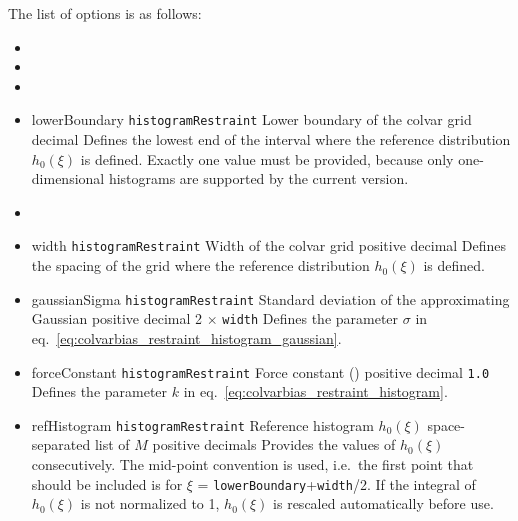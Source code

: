 The list of options is as follows:
\begin{itemize}

\item {}
\item {}
\item {}

\item %
  \key
    {lowerBoundary}{%
    \texttt{histogramRestraint}}{%
    Lower boundary of the colvar grid}{%
    decimal}{%
    Defines the lowest end of the interval where the reference distribution $h_{0}(\xi)$ is defined.
    Exactly one value must be provided, because only one-dimensional histograms are supported by the current version.
  }

\item %

\item %
  \key
  {width}{%
    \texttt{histogramRestraint}}{%
    Width of the colvar grid}{%
    positive decimal}{%
    Defines the spacing of the grid where the reference distribution $h_{0}(\xi)$ is defined.
  }

\item %
  \keydef
  {gaussianSigma}{%
    \texttt{histogramRestraint}}{%
    Standard deviation of the approximating Gaussian}{%
    positive decimal}{%
    2 $\times$ \texttt{width}}{%
    Defines the parameter $\sigma$ in eq.~\ref{eq:colvarbias_restraint_histogram_gaussian}.
  }

\item %
  \keydef
    {forceConstant}{%
    \texttt{histogramRestraint}}{%
    Force constant ()}{%
    positive decimal}{%
    \texttt{1.0}}{%
    Defines the parameter $k$ in eq.~\ref{eq:colvarbias_restraint_histogram}.
  }

\item %
  \key
  {refHistogram}{%
    \texttt{histogramRestraint}}{%
    Reference histogram $h_{0}(\xi)$}{%
    space-separated list of $M$ positive decimals}{%
    Provides the values of $h_{0}(\xi)$ consecutively.
    The mid-point convention is used, i.e.~the first point that should be included is for $\xi$ = \texttt{lowerBoundary}+\texttt{width}/2.
    If the integral of $h_{0}(\xi)$ is not normalized to 1, $h_{0}(\xi)$ is rescaled automatically before use.
  }


\end{itemize}
